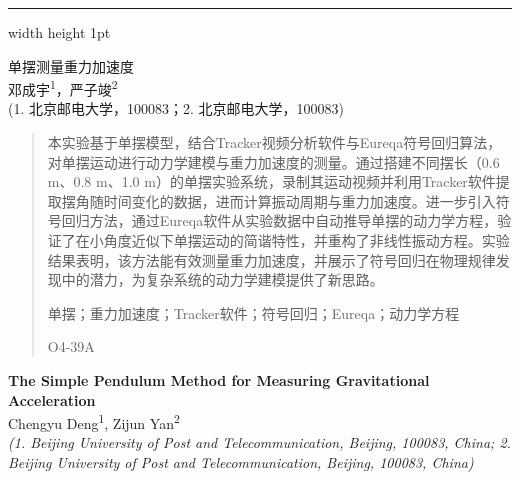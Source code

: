 \documentclass[12pt,a4paper]{article}
\begin{document}
\thispagestyle{firstpage}

\vspace*{-2cm}
\hrule width \textwidth height 1pt
\vspace{1.5cm}

\begin{center}
    {\heiti 单摆测量重力加速度} \\[0.5\baselineskip]

    {\kaishu 邓成宇\textsuperscript{1}，严子竣\textsuperscript{2}} \\[0.3\baselineskip]

    {\kaishu (1. 北京邮电大学，100083；2. 北京邮电大学，100083)} \\[0.5\baselineskip]
\end{center}

\begin{quote}
    \songti
    \setlength{\leftskip}{2em}
    \setlength{\rightskip}{2em}

    本实验基于单摆模型，结合Tracker视频分析软件与Eureqa符号回归算法，对单摆运动进行动力学建模与重力加速度的测量。通过搭建不同摆长（0.6 m、0.8 m、1.0 m）的单摆实验系统，录制其运动视频并利用Tracker软件提取摆角随时间变化的数据，进而计算振动周期与重力加速度。进一步引入符号回归方法，通过Eureqa软件从实验数据中自动推导单摆的动力学方程，验证了在小角度近似下单摆运动的简谐特性，并重构了非线性振动方程。实验结果表明，该方法能有效测量重力加速度，并展示了符号回归在物理规律发现中的潜力，为复杂系统的动力学建模提供了新思路。

    \vspace{0.5\baselineskip}
    单摆；重力加速度；Tracker软件；符号回归；Eureqa；动力学方程

    O4-39A
\end{quote}

\vspace{1cm}

\begin{center}
    {\fontsize{15}{18}\selectfont\bfseries The Simple Pendulum Method for Measuring Gravitational Acceleration} \\[0.3\baselineskip]

    {\fontsize{10.5}{12.6}\selectfont Chengyu Deng\textsuperscript{1}, Zijun Yan\textsuperscript{2}} \\[0.3\baselineskip]

    {\fontsize{9}{10.8}\selectfont\itshape (1. Beijing University of Post and Telecommunication, Beijing, 100083, China; 2. Beijing University of Post and Telecommunication, Beijing, 100083, China)} \\[0.5\baselineskip]
\end{center}
\end{document}
